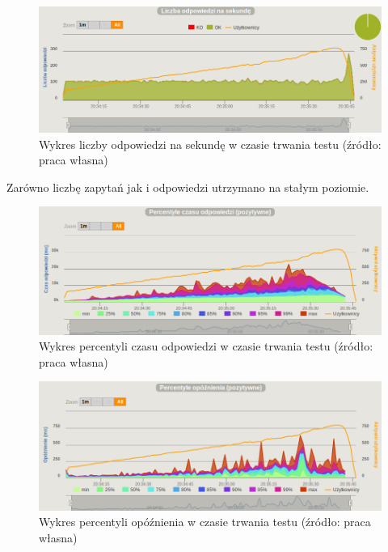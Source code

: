 \documentclass[12pt,twoside]{article}
\begin{document}
\begin{figure}[htbp]
\centering
\includegraphics[resolution=150]{test_results/js/file/screenshots/responses.png}
\caption{Wykres liczby odpowiedzi na sekundę w czasie trwania testu (źródło: praca własna)}
\end{figure}

Zarówno liczbę zapytań jak i odpowiedzi utrzymano na stałym poziomie.

\begin{figure}[htbp]
\centering
\includegraphics[resolution=150]{test_results/js/file/screenshots/response_percentile.png}
\caption{Wykres percentyli czasu odpowiedzi w czasie trwania testu (źródło: praca własna)}
\end{figure}

\begin{figure}[htbp]
\centering
\includegraphics[resolution=150]{test_results/js/file/screenshots/latency_percentile.png}
\caption{Wykres percentyli opóźnienia w czasie trwania testu (źródło: praca własna)}
\end{figure}
\end{document}
